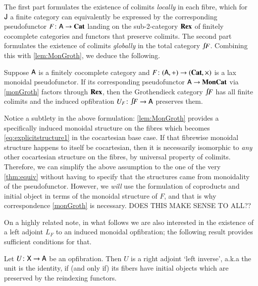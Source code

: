 \documentclass[reqno]{amsart}
\begin{document}
The first part formulates the existence of colimits \emph{locally} in each fibre, which for $\mathsf{J}$ a finite category can equivalently be expressed by the corresponding pseudofunctor $F\colon\mathsf{A}\to\mathbf{Cat}$ landing on the sub-2-category $\mathbf{Rex}$ of finitely cocomplete categories and functors that preserve colimits. The second part formulates the existence of colimits \emph{globally} in the total category $\inta F$. Combining this with \cref{lem:MonGroth}, we deduce the following.

\begin{cor}\label{cor:fcocMonGroth}
 Suppose $\mathsf{A}$ is a finitely cocomplete category and $F\colon(\mathsf{A},+)\to(\mathbf{Cat},\times)$ is a lax monoidal pseudofunctor. If its corresponding pseudofunctor $\mathsf{A}\to\mathbf{MonCat}$ via \cref{monGroth} factors through $\mathbf{Rex}$, then the Grothendieck category $\inta F$ has all finite colimits and the induced opfibration $U_F\maps\inta F\to\A$ preserves them. 
\end{cor}

Notice a subtlety in the above formulation: \cref{lem:MonGroth} provides a specifically induced monoidal structure on the fibres which becomes \cref{eq:explicitstructure1} in the cocartesian base case. If that fibrewise monoidal structure happens to itself be cocartesian, then it is necessarily isomorphic to \emph{any} other cocartesian structure on the fibres, by universal property of colimits. Therefore, we can simplify the above assumption to the one of the very \cref{thm:equiv} without having to specify that the structures came from monoidality of the pseudofunctor. However, we \emph{will} use the formulation of coproducts and initial object in terms of the monoidal structure of $F$, and that is why correspondence \cref{monGroth} is necessary.
DOES THIS MAKE SENSE TO ALL?? %

On a highly related note, in what follows we are also interested in the existence of a left adjoint $L_F$ to an induced monoidal opfibration; the following result provides sufficient conditions for that.

\begin{lem}\label{prop:opfibtolari}
  Let $U \colon\mathsf{X} \to \mathsf{A}$ be an opfibration. Then
  $U$ is a right adjoint `left inverse', a.k.a the unit is the identity, if (and only if) its fibers have
  initial objects which are preserved by the
  reindexing functors.
\end{lem}
\end{document}
